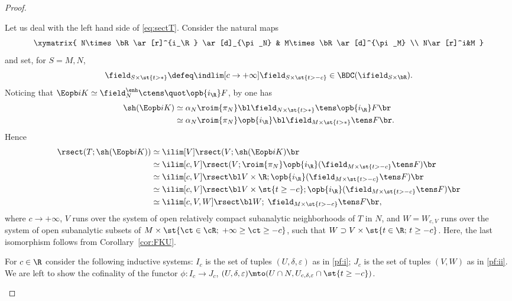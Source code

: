 \begin{proof}
\begin{enumeratei}
\item\label{pf:ii}
Let us deal with the left hand side of \eqref{eq:sectT}.
Consider the natural maps
\[
\xymatrix{
N\times\bR \ar[r]^{i_\R} \ar[d]_{\pi_N} & M\times \bR \ar[d]^{\pi_M} \\
N\ar[r]^i&M
}\]
and set, for $S=M,N$,
\[
\field_{S\times\st{t>\ast}} \defeq \indlim[c\to+\infty]\field_{S\times\st{t>-c}} \in \BDC(\ifield_{S\times\bR}).
\]
Noticing that $\Eopb i K \simeq \field_N^\enh\ctens\quot\opb{i_\R}F$, by \cite[Prop.\,6.6.5]{KS16} one has
\begin{align*}
\sh(\Eopb i K)
&\simeq \alpha_N\roim{{\pi_N}}\bl\field_{N\times\st{t>\ast}}\tens \opb{i_\R}F\br \\
&\simeq \alpha_N\roim{{\pi_N}}\opb{i_\R}\bl\field_{M\times\st{t>\ast}}\tens F\br.
\end{align*}
Hence
\begin{align*}
\rsect(T;\sh(\Eopb i K))
&\simeq \ilim[V]\rsect(V;\sh(\Eopb i K)\br \\
&\simeq\ilim[c,V]\rsect(V;
\roim{{\pi_N}}\opb{i_\R}(\field_{M\times\st{t>-c}}\tens F)\br \\
&\simeq\ilim[c,V]\rsect\bl V\times\R;\opb{i_\R}(\field_{M\times\st{t>-c}}\tens F)\br \\
&\simeq\ilim[c,V]\rsect\bl V\times\st{t\ge-c};
\opb{i_\R}(\field_{M\times\st{t>-c}}\tens F)\br \\
&\simeq \ilim[c,V,W]\rsect\bl W;\; \field_{M\times\st{t>-c}}\tens F\br,
\end{align*}
where $c\to+\infty$, $V$ runs over the system of open relatively compact subanalytic neighborhoods of $T$ in $N$,
and $W=W_{c,V}$ runs over the system of open subanalytic subsets of
$M\times\st{\ct\in\cR;\;+\infty\ge \ct\ge-c}$, such that $W\supset V\times\st{t\in\R;\,t\ge -c}$.
Here, the last isomorphism follows from Corollary~\ref{cor:FKU}.

\item\label{pf:iii}
For $c\in \R$ consider the following inductive systems: $I_c$ is the set of tuples $(U,\delta,\varepsilon)$ as in \eqref{pf:i}; $J_c$ is the set of tuples $(V,W)$ as in \eqref{pf:ii}. We are left to show the cofinality of the functor $\phi\colon I_c \to J_c$, $(U,\delta,\varepsilon)\mto(U\cap N,U_{c,\delta,\varepsilon}\cap\st{t\ge -c})$.


\end{enumeratei}
\end{proof}
